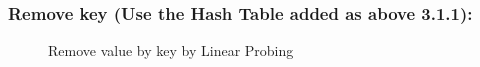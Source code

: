 \subsubsection{Remove key (Use the Hash Table added as above 3.1.1):}
\begin{figure}[H]
	\centering
	\qquad
	\caption{Remove value by key by Linear Probing}%
\end{figure}

